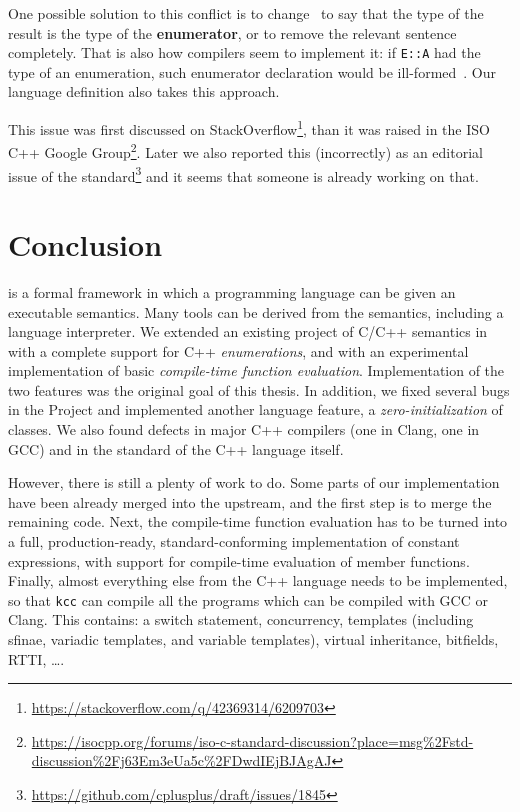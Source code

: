 \documentclass[nolot,nolof,nocover,printed]{fithesis3}
\newcommand{\kcc}{\texttt{kcc}\xspace}
\newcommand{\stdN}[2]{\cite[#2]{#1}\xspace}
\begin{document}
One possible solution to this conflict is to change~\stdN{n4296}{\S 5.1.1/11} to say
that the type of the result is the type of the \textbf{enumerator},
or to remove the relevant sentence completely. That is also how compilers seem to implement it: if \lstinline|E::A| had the type of an enumeration, such enumerator declaration would be ill-formed~\stdN{n4296}{\S 5.1.1/5}. Our language definition also takes this approach.

This issue was first discussed on StackOverflow\footnote{\url{https://stackoverflow.com/q/42369314/6209703}}, than it was raised in the ISO C++ Google Group\footnote{\url{https://isocpp.org/forums/iso-c-standard-discussion?place=msg\%2Fstd-discussion\%2Fj63Em3eUa5c\%2FDwdIEjBJAgAJ}}. Later we also reported this (incorrectly) as an editorial issue of the standard\footnote{\url{https://github.com/cplusplus/draft/issues/1845}} and it seems that someone is already working on that.


\chapter{Conclusion}

\K is a formal framework in which a programming language can be given an executable semantics. Many tools can be derived from the semantics, including a language interpreter. We extended an existing project of C/C++ semantics in \K with a complete support for C++ \textit{enumerations}, and with an experimental implementation of basic \textit{compile-time function evaluation}. Implementation of the two features was the original goal of this thesis. In addition, we fixed several bugs in the Project and implemented another language feature, a \textit{zero-initialization} of classes. We also found defects in major C++ compilers (one in Clang, one in GCC) and in the standard of the C++ language itself.

However, there is still a plenty of work to do. Some parts of our implementation have been already merged into the upstream, and the first step is to merge the remaining code. Next, the compile-time function evaluation has to be turned into a full, production-ready, standard-conforming implementation of constant expressions, with support for compile-time evaluation of member functions. Finally, almost everything else from the C++ language needs to be implemented, so that \kcc can compile all the programs which can be compiled with GCC or Clang. This contains: a switch statement, concurrency, templates (including sfinae, variadic templates, and variable templates), virtual inheritance, bitfields, RTTI, \ldots .
\end{document}
